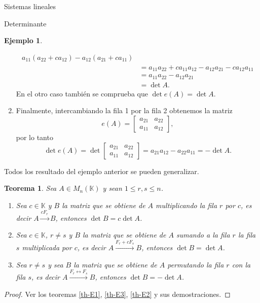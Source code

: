 \documentclass[a4paper,12pt,twoside,spanish,reqno]{amsbook}
\newtheorem{teorema}{Teorema}[section]
\theoremstyle{definition}
\newtheorem{ejemplo}{Ejemplo}[section]
\theoremstyle{remark}
\newcommand{\K}{\mathbb K}
\begin{document}
\begin{chapter}{Sistemas lineales}
\begin{section}{Determinante}
\begin{ejemplo}
\begin{enumerate}
\begin{align*}
				a_{11}(a_{22}+ ca_{12})- a_{12}( a_{21}+ ca_{11}) \\
				&= a_{11}a_{22}+ ca_{11}a_{12}- a_{12} a_{21}- ca_{12} a_{11}\\
				&= a_{11}a_{22}- a_{12} a_{21} \\
				&= \det A.
			\end{align*}
			En  el otro caso también se comprueba que $\det e(A) = \det A$. 
			\item Finalmente, intercambiando la fila 1 por la fila 2 obtenemos la matriz
			\begin{equation*}
			e(A)=\begin{bmatrix} a_{21}& a_{22}\\ a_{11}&a_{12}\end{bmatrix},
			\end{equation*}
			por lo tanto 
			\begin{equation*}
			\det e(A)= \det \begin{bmatrix} a_{21}& a_{22}\\ a_{11}&a_{12}\end{bmatrix} = a_{21}a_{12} - a_{22}a_{11} = -\det A.
			\end{equation*}
		\end{enumerate}
	\end{ejemplo}
	
	Todos los resultado del ejemplo anterior se pueden generalizar. 
	
	\begin{teorema} \label{det-prop-fundamentales}
		Sea $A  \in M_n(\K)$ y sean $1 \le r,s \le n$.
		\begin{enumerate}
			\item Sea $c \in \K$ y $B$ la matriz que se obtiene de $A$ multiplicando la fila $r$ por $c$, es decir $A  \stackrel{cF_r}{\longrightarrow} B$, entonces $\det B = c \det A$.
			\item  Sea $c \in \K$, $r \ne s$ y $B$ la matriz que se obtiene de $A$ sumando a la fila $r$ la fila $s$ multiplicada por $c$, es decir  $A  \stackrel{F_r + cF_s}{\longrightarrow} B$, entonces $\det B = \det A$.
			\item Sea $r \ne s$ y sea $B$ la matriz que se obtiene de $A$ permutando la fila $r$ con la fila $s$, es decir  $A  \stackrel{F_r \leftrightarrow F_s}{\longrightarrow}B$, entonces $\det B = -\det A$.
			
		\end{enumerate}
	\end{teorema}
	\begin{proof}
		Ver  los teoremas \ref{th-E1}, \ref{th-E3}, \ref{th-E2} y  sus demostraciones.
	\end{proof}


\end{section}
\end{chapter}
\end{document}
